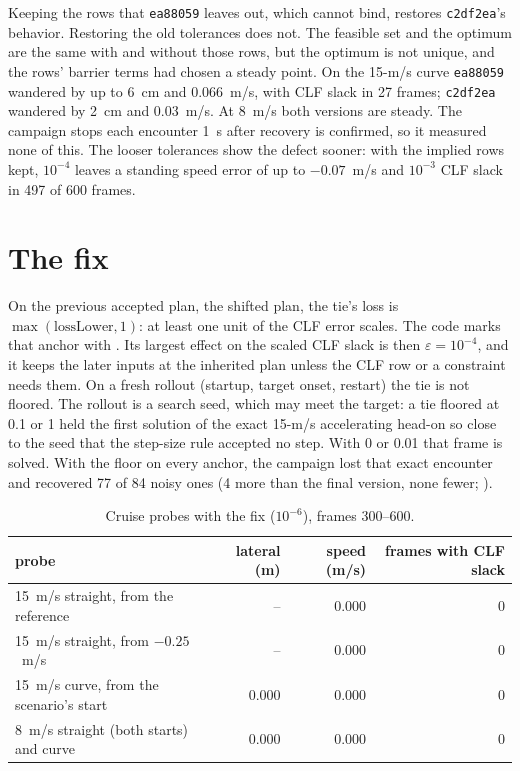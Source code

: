 \documentclass[11pt]{article}
\begin{document}
Keeping the rows that \texttt{ea88059} leaves out, which cannot bind,
restores \texttt{c2df2ea}'s behavior. Restoring the old tolerances does not.
The feasible set and the optimum are the same with and without those rows,
but the optimum is not unique, and the rows' barrier terms had chosen a
steady point. On the 15-m/s curve \texttt{ea88059} wandered by up to 6~cm
and 0.066~m/s, with CLF slack in 27 frames; \texttt{c2df2ea} wandered by
2~cm and 0.03~m/s. At 8~m/s both versions are steady. The campaign stops
each encounter 1~s after recovery is confirmed, so it measured none of
this. The looser tolerances show the defect sooner: with the implied rows
kept, $10^{-4}$ leaves a standing speed error of up to $-0.07$~m/s and
$10^{-3}$ CLF slack in 497 of 600 frames.

\section{The fix}
On the previous accepted plan, the shifted plan, the tie's loss is
$\max(\mathrm{lossLower},1)$: at least one unit of the CLF error scales.
The code marks that anchor with . Its largest effect on the scaled CLF slack is then
$\varepsilon=10^{-4}$, and it keeps the later inputs at the inherited plan
unless the CLF row or a constraint needs them. On a fresh rollout (startup,
target onset, restart) the tie is not floored. The rollout is a search seed,
which may meet the target: a tie floored at 0.1 or 1 held the first solution
of the exact 15-m/s accelerating head-on so close to the seed that the
step-size rule accepted no step. With 0 or 0.01 that frame is solved. With
the floor on every anchor, the campaign lost that exact encounter and
recovered 77 of 84 noisy ones (4 more than the final version, none fewer;
).

\begin{table}[h]
\centering\small
\caption{Cruise probes with the fix ($10^{-6}$), frames 300--600.}
\begin{tabular}{lrrr}
\toprule
probe & lateral (m) & speed (m/s) & frames with CLF slack\\
\midrule
15~m/s straight, from the reference & -- & 0.000 & 0\\
15~m/s straight, from $-0.25$~m/s & -- & 0.000 & 0\\
15~m/s curve, from the scenario's start & 0.000 & 0.000 & 0\\
8~m/s straight (both starts) and curve & 0.000 & 0.000 & 0\\
\bottomrule
\end{tabular}
\end{table}
\end{document}

